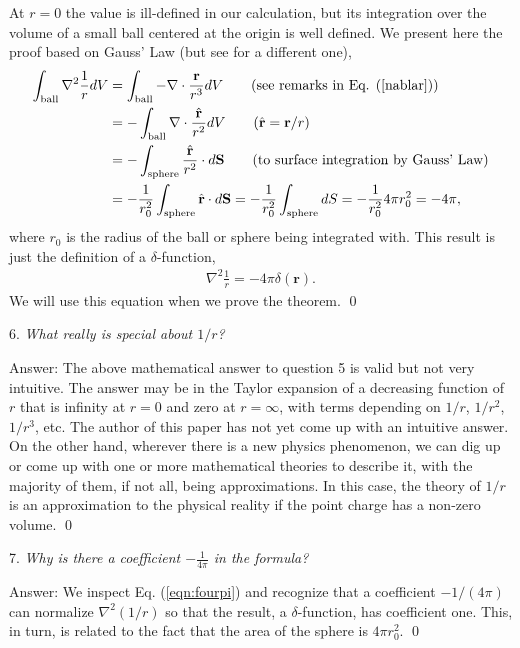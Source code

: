 \documentclass[11pt]{article}              %
\begin{document}
At $r=0$ the value is ill-defined in our calculation, but its integration over the volume of a small ball centered at the origin is well defined. We present here the proof based on Gauss' Law (but see \cite{melia2001electrodynamics} for a different one),
\begin{align}
\int_{\text{ball}}\nabla^2\frac{1}{r}dV&=\int_{\text{ball}}-\nabla\cdot\frac{\mathbf r}{r^3}dV\tag{see remarks in Eq. (\ref{nablar})}\\
&=-\int_{\text{ball}}\nabla\cdot\frac{\hat{\mathbf r}}{r^2}dV\tag{$\hat{\mathbf r}={\mathbf r}/r$}\\
&=-\int_{\text{sphere}}\frac{\hat{\mathbf r}}{r^2}\cdot d{\mathbf S}\tag{to surface integration by Gauss' Law}\\
&=-\frac{1}{r_0^2}\int_{\text{sphere}}\hat{\mathbf r}\cdot d{\mathbf S}=-\frac{1}{r_0^2}\int_{\text{sphere}}dS=-\frac{1}{r_0^2}4\pi r_0^2=-4\pi,\notag
\end{align}
where $r_0$ is the radius of the ball or sphere being integrated with. This result is just the definition of a $\delta$-function,
\begin{align}
	\nabla^2\frac{1}{r}=-4\pi\delta({\mathbf r}).\label{eqn:fourpi}
\end{align}
We will use this equation when we prove the theorem. \qed

6. {\it What really is special about $1/r$?}

Answer: The above mathematical answer to question 5 is valid but not very intuitive. The answer may be in the Taylor expansion of a decreasing function of $r$ that is infinity at $r=0$ and zero at $r=\infty$, with terms depending on $1/r$, $1/r^2$, $1/r^3$, etc. The author of this paper has not yet come up with an intuitive answer. On the other hand, wherever there is a new physics phenomenon, we can dig up or come up with one or more mathematical theories to describe it, with the majority of them, if not all, being approximations. In this case, the theory of $1/r$ is an approximation to the physical reality if the point charge has a non-zero volume. \qed

7. {\it Why is there a coefficient $-\frac{1}{4\pi}$ in the formula?} 

Answer: We inspect Eq. (\ref{eqn:fourpi}) and recognize that a coefficient $-1/(4\pi)$ can normalize $\nabla^2(1/r)$ so that the result, a $\delta$-function, has coefficient one. This, in turn, is related to the fact that the area of the sphere is $4\pi r_0^2$. \qed
\end{document}
